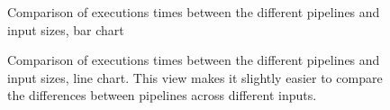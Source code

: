 \begin{figure}[H]
    \centering
    
    \caption{Comparison of executions times between the different pipelines and input sizes, bar chart}
    \label{fig:results1}
\end{figure}
\begin{figure}[H]
    \centering
    
    \caption{Comparison of executions times between the different pipelines and input sizes, line chart. This view makes it slightly easier to compare the differences between pipelines across different inputs.}
    \label{fig:results2}
\end{figure}

